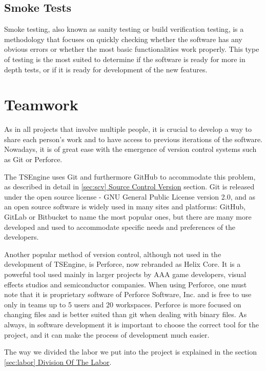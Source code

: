 \subsection{Smoke Tests}
\hspace{\parindent}
Smoke testing, also known as sanity testing or build verification testing, is a methodology that focuses on quickly checking whether the software has any obvious errors or whether the most basic functionalities work properly. This type of testing is the most suited to determine if the software is ready for more in depth tests, or if it is ready for development of the new features.

\newpage
\section{Teamwork}
\label{sec:teamwork}
\hspace{\parindent} %

As in all projects that involve multiple people, it is crucial to develop a way to share each person's work and to have access to previous iterations of the software. Nowadays, it is of great ease with the emergence of version control systems such as Git or Perforce. 

The TSEngine uses Git and furthermore GitHub to accommodate this problem, as described in detail in \hyperref[sec:scv]{\ref*{sec:scv} Source Control Version} section. Git is released under the open source license -  GNU General Public License version 2.0, and as an open source software is widely used in many sites and platforms: GitHub, GitLab or Bitbucket to name the most popular ones, but there are many more developed and used to accommodate specific needs and preferences of the developers.

Another popular method of version control, although not used in the development of TSEngine, is Perforce, now rebranded as Helix Core. It is a powerful tool used mainly in larger projects by AAA game developers, visual effects studios and semiconductor companies. When using Perforce, one must note that it is proprietary software of Perforce Software, Inc. and is free to use only in teams up to 5 users and 20 workspaces. Perforce is more focused on changing files and is better suited than git when dealing with binary files. As always, in software development it is important to choose the correct tool for the project, and it can make the process of development much easier.

The way we divided the labor we put into the project is explained in the section \hyperref[sec:labor]{\ref*{sec:labor} Division Of The Labor}.



